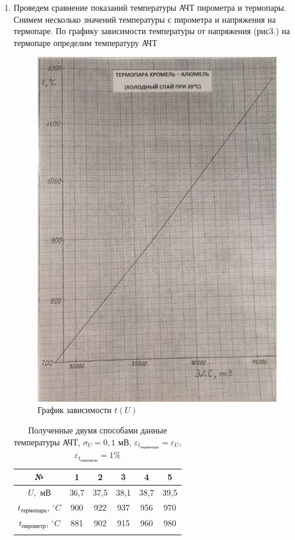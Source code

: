 \documentclass[a4paper, 12pt]{article}%
\begin{document}
	\begin{enumerate}
		
		\item Проведем сравнение показаний температуры АЧТ пирометра и термопары. Снимем несколько значений температуры с пирометра и напряжения на термопаре. По графику зависимости температуры от напряжения (рис3.) на термопаре определим температуру АЧТ 
		
		\begin{figure}[H]
			\includegraphics[scale=0.9]{t(U)}
			\centering
			\caption{График зависимости $t(U)$}
		\end{figure}
		
		
		\begin{longtable}{|c|c|c|c|c|c|}
			\hline
			№ & 1 & 2 & 3 & 4 & 5\\ \hline
			$U, $ мВ & 36,7 & 37,5 & 38,1 & 38,7 & 39,5 \\ \hline
			$t_{\text{термопара}}$, $^\circ C$ & 900 & 922 & 937 & 956 & 970 \\ \hline
			$t_{\text{пирометр}}$, $^\circ C$ & 881 & 902 & 915 & 960 & 980 \\ \hline
			\caption{Полученные двумя способами данные температуры АЧТ, $\sigma_U = 0,1$ мВ, $\varepsilon_{t_{\text{термопара}}} = \varepsilon_U$, $\varepsilon_{t_{\text{пирометр}}} = 1\%$}
		\end{longtable}
		

\end{enumerate}
\end{document}

